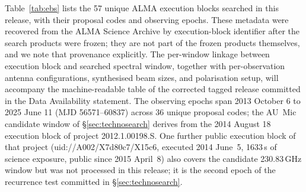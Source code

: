\documentclass{openjournal}
\begin{document}
Table~\ref{tab:ebs} lists the 57 unique ALMA execution blocks searched in
this release, with their proposal codes and observing epochs. These
metadata were recovered from the ALMA Science Archive by
execution-block identifier after the search products were frozen; they are
not part of the frozen products themselves, and we note that
provenance explicitly. The per-window linkage between execution block
and searched spectral window, together with per-observation antenna
configurations, synthesised beam sizes, and polarisation setup, will
accompany the machine-readable table of the corrected tagged release
committed in the Data Availability statement. The observing epochs span
2013 October 6 to 2025 June 11 (MJD 56571--60837) across 36 unique
proposal codes; the AU~Mic candidate window of
\S\ref{sec:technosearch} derives from the 2014 August 18 execution
block of project 2012.1.00198.S. One further public execution block of
that project (uid://A002/X7d80c7/X15c6, executed 2014 June~5, 1633\,s
of science exposure, public since 2015 April~8) also covers the
candidate 230.83\,GHz window but was not processed in this release;
it is
the second epoch of the recurrence test committed in
\S\ref{sec:technosearch}.
\end{document}
